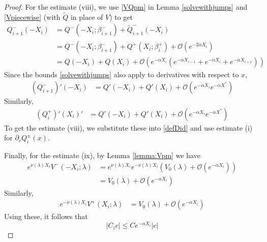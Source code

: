 \documentclass[thesis.tex]{subfiles}
\begin{document}
\begin{lemma}
\begin{proof}
For the estimate (viii), we use \eqref{VQpm} in Lemma \ref{solvewithjumps} and \eqref{Vpiecewise} (with $\tilde{Q}$ in place of $V$) to get
\begin{align*}
Q_{i+1}^-(-X_i) &= Q^-(-X_i; \beta_{i+1}^-) + \tilde{Q}_{i+1}^-(-X_i) \\
&= Q^-(-X_i; \beta_{i+1} ^-) + Q^+(X_i; \beta_i^+) + \mathcal{O}(e^{-2 \alpha X_i}) \\
&= Q(-X_i) + Q(X_i) 
+ \mathcal{O}(e^{-\alpha X_i}(e^{-\alpha X_{i-1}}+e^{-\alpha X_i}+e^{-\alpha X_{i+1}}))
\end{align*}
Since the bounds \ref{solvewithjumps} also apply to derivatives with respect to $x$, 
\begin{align*}
(Q_{i+1}^-)'(-X_i) &= Q'(-X_i) + Q'(X_i) + \mathcal{O}(e^{-\alpha X_i}e^{-\alpha X^*})
\end{align*}
Similarly,
\begin{align*}
(Q_i^+)'(X_i)' &= Q'(-X_i) + Q'(X_i) + \mathcal{O}(e^{-\alpha X_i}e^{-\alpha X^*})
\end{align*}
To get the estimate (viii), we substitute these into \cref{defDid} and use estimate (i) for $\partial_c Q_i^\pm(x)$.

Finally, for the estimate (ix), by Lemma \ref{lemma:Vpm} we have
\begin{align*}
e^{\nu(\lambda) X_i} V^-(-X_i; \lambda) 
&= e^{\nu(\lambda) X_i} e^{-\nu(\lambda) X_i}\left(V_0(\lambda) + \mathcal{O}(e^{-\alpha X_i}) \right) \\
&= V_0(\lambda) + \mathcal{O}(e^{-\alpha X_i})
\end{align*}
Similarly,
\begin{align*}
e^{-\nu(\lambda) X_i} V^+(X_i; \lambda)
&= V_0(\lambda) + \mathcal{O}(e^{-\alpha X_i})
\end{align*}
Using these, it follows that
\[
|C_i c| \leq C e^{-\alpha X_i} |c|
\]
\end{proof}
\end{lemma}

\iffulldocument\else
	
	
\fi
\end{document}
